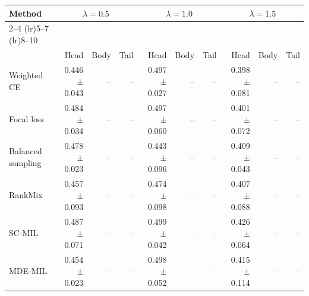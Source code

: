 \begin{tabular}{lrrrrrrrrr}
\toprule
Method & \multicolumn{3}{c}{$\lambda=0.5$} & \multicolumn{3}{c}{$\lambda=1.0$} & \multicolumn{3}{c}{$\lambda=1.5$} \\ \cmidrule(lr){2--4} \cmidrule(lr){5--7} \cmidrule(lr){8--10}\\
 & Head & Body & Tail & Head & Body & Tail & Head & Body & Tail\\
\midrule
Weighted CE & \num{0.446} $\pm$ \num{0.043} & -- & -- & \num{0.497} $\pm$ \num{0.027} & -- & -- & \num{0.398} $\pm$ \num{0.081} & -- & --\\
Focal loss & \num{0.484} $\pm$ \num{0.034} & -- & -- & \num{0.497} $\pm$ \num{0.060} & -- & -- & \num{0.401} $\pm$ \num{0.072} & -- & --\\
Balanced sampling & \num{0.478} $\pm$ \num{0.023} & -- & -- & \num{0.443} $\pm$ \num{0.096} & -- & -- & \num{0.409} $\pm$ \num{0.043} & -- & --\\
RankMix & \num{0.457} $\pm$ \num{0.093} & -- & -- & \num{0.474} $\pm$ \num{0.098} & -- & -- & \num{0.407} $\pm$ \num{0.088} & -- & --\\
SC-MIL & \num{0.487} $\pm$ \num{0.071} & -- & -- & \num{0.499} $\pm$ \num{0.042} & -- & -- & \num{0.426} $\pm$ \num{0.064} & -- & --\\
MDE-MIL & \num{0.454} $\pm$ \num{0.023} & -- & -- & \num{0.498} $\pm$ \num{0.052} & -- & -- & \num{0.415} $\pm$ \num{0.114} & -- & --\\
\bottomrule
\end{tabular}
